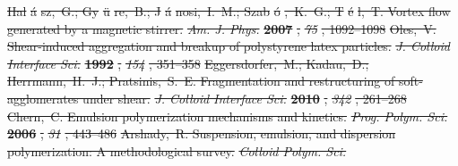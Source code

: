 \documentclass[journal=langd5,manuscript=article]{achemso}
\providecommand{\DIFdel}[1]{{\protect\color{red}\sout{#1}}}                      %
\begin{document}
\DIFdel{Hal}%
\DIFdel{\'a}%
\DIFdel{sz,~G.; Gy}%
\DIFdel{\"u}%
\DIFdel{re,~B.; J}%
\DIFdel{\'a}%
\DIFdel{nosi,~I.~M.; Szab}%
\DIFdel{\'o}%
\DIFdel{,~K.~G.; T}%
\DIFdel{\'e}%
\DIFdel{l,~T.
  Vortex flow generated by a magnetic stirrer. }\emph{\DIFdel{Am. J. Phys.}}
\textbf{\DIFdel{2007}}%
\DIFdel{, }\emph{\DIFdel{75}}%
\DIFdel{, 1092--1098}%
\DIFdel{Oles,~V. Shear-induced aggregation and breakup of polystyrene latex particles.
  }\emph{\DIFdel{J. Colloid Interface Sci.}} %
\textbf{\DIFdel{1992}}%
\DIFdel{, }\emph{\DIFdel{154}}%
\DIFdel{, 351--358}%
\DIFdel{Eggersdorfer,~M.; Kadau,~D.; Herrmann,~H.~J.; Pratsinis,~S.~E. Fragmentation
  and restructuring of soft-agglomerates under shear. }\emph{\DIFdel{J. Colloid
  Interface Sci.}} %
\textbf{\DIFdel{2010}}%
\DIFdel{, }\emph{\DIFdel{342}}%
\DIFdel{, 261--268}%
\DIFdel{Chern,~C. Emulsion polymerization mechanisms and kinetics. }\emph{\DIFdel{Prog. Polym.
  Sci.}} %
\textbf{\DIFdel{2006}}%
\DIFdel{, }\emph{\DIFdel{31}}%
\DIFdel{, 443--486}%
\DIFdel{Arshady,~R. Suspension, emulsion, and dispersion polymerization: A
  methodological survey. }\emph{\DIFdel{Colloid Polym. Sci.}} %
\end{document}
